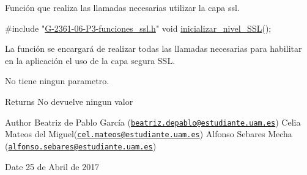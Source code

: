 Función que realiza las llamadas necesarias utilizar la capa ssl.


\begin{DoxyCode}
\textcolor{preprocessor}{       #include "\hyperlink{_g-2361-06-_p3-funciones__ssl_8h}{G-2361-06-P3-funciones\_ssl.h}"}
\textcolor{keywordtype}{void} \hyperlink{_g-2361-06-_p3-funciones__ssl_8h_a937108af8fd0832377b084e24172ee41}{inicializar\_nivel\_SSL}();
\end{DoxyCode}


La función se encargará de realizar todas las llamadas necesarias para habilitar en la aplicación el uso de la capa segura S\+SL.

No tiene ningun parametro.

\begin{DoxyReturn}{Returns}
No devuelve ningun valor
\end{DoxyReturn}
\begin{DoxyAuthor}{Author}
Beatriz de Pablo García (\href{mailto:beatriz.depablo@estudiante.uam.es}{\tt beatriz.\+depablo@estudiante.\+uam.\+es}) Celia Mateos del Miguel(\href{mailto:cel.mateos@estudiante.uam.es}{\tt cel.\+mateos@estudiante.\+uam.\+es}) Alfonso Sebares Mecha (\href{mailto:alfonso.sebares@estudiante.uam.es}{\tt alfonso.\+sebares@estudiante.\+uam.\+es})
\end{DoxyAuthor}
\begin{DoxyDate}{Date}
25 de Abril de 2017
\end{DoxyDate}


 